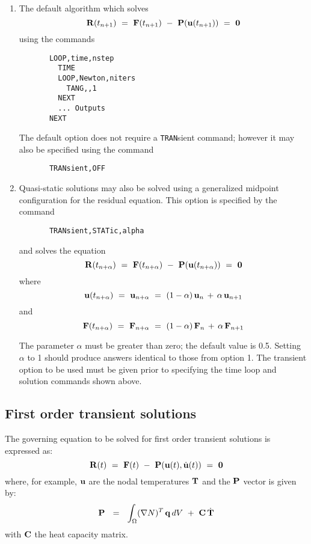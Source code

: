 \begin{enumerate}
\item
The default algorithm which solves
\begin{equation}
\mathbf{R} (t_{n+1}) ~=~ \mathbf{F}(t_{n+1}) ~-~ \mathbf{P}( \mathbf{u}(t_{n+1}) ) ~=~ {\bf 0}
\end{equation}
using the commands
\begin{verbatim}
       LOOP,time,nstep
         TIME
         LOOP,Newton,niters
           TANG,,1
         NEXT
         ... Outputs
       NEXT
\end{verbatim}
The default option does not require a {\tt TRAN}sient command; however it
may also be specified using the command
\begin{verbatim}
       TRANsient,OFF
\end{verbatim}

\item
Quasi-static solutions may also be solved using a generalized
mid\-point con\-fig\-uration for the residual equation.  This option
is specified by the command
\begin{verbatim}
       TRANsient,STATic,alpha
\end{verbatim}
and solves the equation
\begin{equation}
\mathbf{R} (t_{n+\alpha}) ~=~ \mathbf{F}(t_{n+\alpha}) ~-~ \mathbf{P}( \mathbf{u}(t_{n+\alpha}) )
~=~ {\bf 0}
\end{equation}
where
\begin{equation}
\mathbf{u}(t_{n+\alpha}) ~=~
\mathbf{u}_{n+\alpha} ~=~ (1 - \alpha) \, \mathbf{u}_n \,+\, \alpha \, \mathbf{u}_{n+1}
\end{equation}
and
\begin{equation}
\mathbf{F}(t_{n+\alpha}) ~=~
\mathbf{F}_{n+\alpha} ~=~ (1 - \alpha) \, \mathbf{F}_n \,+\, \alpha \, \mathbf{F}_{n+1}
\end{equation}

The parameter $\alpha$ must be greater than zero; the default value is 0.5.
Setting $\alpha$ to 1 should produce answers identical to those from
option 1.
The transient option to be used must be given prior to specifying the time loop
and solution commands shown above.
\end{enumerate}

\subsection{First order transient solutions}
\label{trans1}

The governing equation to be solved for first order transient solutions
is expressed as:
\begin{equation}
\mathbf{R} (t) ~=~ \mathbf{F}(t) ~-~ \mathbf{P}( \mathbf{u}(t) , \dot{\mathbf{u}} (t) ) ~=~ {\bf 0}
\end{equation}
where, for example, $\mathbf{u}$ are the nodal temperatures $\mathbf{T}$ and the $\mathbf{P}$
vector is given by:
\begin{equation}
\mathbf{P}~~=~~ \int_{\Omega} (\nabla N)^T \, \mathbf{q} \, dV
~+~ \mathbf{C} \, \dot{\mathbf{T}}
\end{equation}
with $\mathbf{C}$ the heat capacity matrix.

